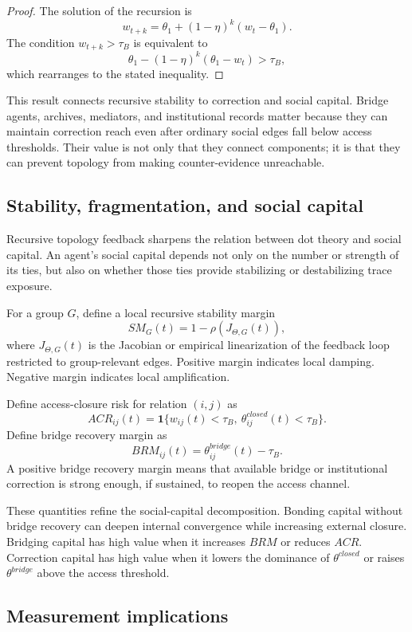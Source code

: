 \documentclass[11pt]{article}
\theoremstyle{remark}
\begin{document}
\begin{proof}
The solution of the recursion is
\[
w_{t+k}=\theta_1+(1-\eta)^k(w_t-\theta_1).
\]
The condition \(w_{t+k}>\tau_B\) is equivalent to
\[
\theta_1-(1-\eta)^k(\theta_1-w_t)>\tau_B,
\]
which rearranges to the stated inequality.
\end{proof}

This result connects recursive stability to correction and social capital. Bridge agents, archives, mediators, and institutional records matter because they can maintain correction reach even after ordinary social edges fall below access thresholds. Their value is not only that they connect components; it is that they can prevent topology from making counter-evidence unreachable.

\subsection{Stability, fragmentation, and social capital}\label{stability-fragmentation-social-capital}

Recursive topology feedback sharpens the relation between dot theory and social capital. An agent's social capital depends not only on the number or strength of its ties, but also on whether those ties provide stabilizing or destabilizing trace exposure.

For a group \(G\), define a local recursive stability margin
\[
SM_G(t)=1-\rho(J_{\Theta,G}(t)),
\]
where \(J_{\Theta,G}(t)\) is the Jacobian or empirical linearization of the feedback loop restricted to group-relevant edges. Positive margin indicates local damping. Negative margin indicates local amplification.

Define access-closure risk for relation \((i,j)\) as
\[
ACR_{ij}(t)=\mathbf 1\{w_{ij}(t)<\tau_B,\ \theta_{ij}^{closed}(t)<\tau_B\}.
\]
Define bridge recovery margin as
\[
BRM_{ij}(t)=\theta_{ij}^{bridge}(t)-\tau_B.
\]
A positive bridge recovery margin means that available bridge or institutional correction is strong enough, if sustained, to reopen the access channel.

These quantities refine the social-capital decomposition. Bonding capital without bridge recovery can deepen internal convergence while increasing external closure. Bridging capital has high value when it increases \(BRM\) or reduces \(ACR\). Correction capital has high value when it lowers the dominance of \(\theta^{closed}\) or raises \(\theta^{bridge}\) above the access threshold.

\subsection{Measurement implications}\label{recursive-stability-measurement-implications}
\end{document}
